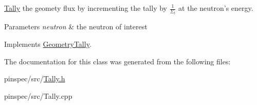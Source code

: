 \hyperlink{classTally}{Tally} the geomety flux by incrementing the tally by $ \frac{1}{\Sigma_t} $ at the neutron's energy. 


\begin{DoxyParams}{Parameters}
{\em neutron} & the neutron of interest \\
\hline
\end{DoxyParams}


Implements \hyperlink{classGeometryTally_a3f79423e0c1e1eb87109c6937bdfa5c8}{Geometry\-Tally}.



The documentation for this class was generated from the following files\-:\begin{DoxyCompactItemize}
\item 
pinspec/src/\hyperlink{Tally_8h}{Tally.\-h}\item 
pinspec/src/Tally.\-cpp\end{DoxyCompactItemize}
